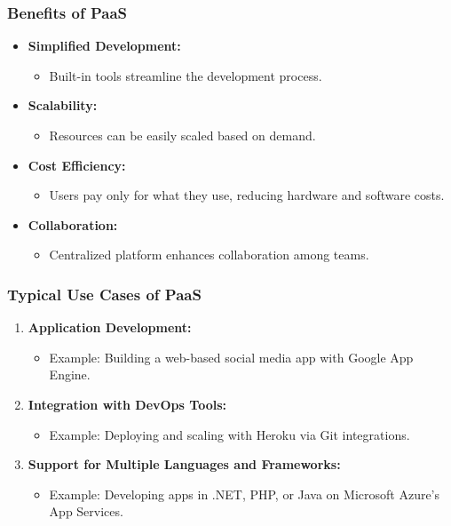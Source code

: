 \documentclass[aspectratio=169]{beamer}
\begin{document}
\begin{frame}[fragile]
    \frametitle{Benefits of PaaS}

    \begin{itemize}
        \item \textbf{Simplified Development:} 
        \begin{itemize}
            \item Built-in tools streamline the development process.
        \end{itemize}
        
        \item \textbf{Scalability:} 
        \begin{itemize}
            \item Resources can be easily scaled based on demand.
        \end{itemize}
        
        \item \textbf{Cost Efficiency:} 
        \begin{itemize}
            \item Users pay only for what they use, reducing hardware and software costs.
        \end{itemize}
        
        \item \textbf{Collaboration:} 
        \begin{itemize}
            \item Centralized platform enhances collaboration among teams.
        \end{itemize}
    \end{itemize}
\end{frame}

\begin{frame}[fragile]
    \frametitle{Typical Use Cases of PaaS}

    \begin{enumerate}
        \item \textbf{Application Development:}
        \begin{itemize}
            \item Example: Building a web-based social media app with Google App Engine.
        \end{itemize}

        \item \textbf{Integration with DevOps Tools:}
        \begin{itemize}
            \item Example: Deploying and scaling with Heroku via Git integrations.
        \end{itemize}

        \item \textbf{Support for Multiple Languages and Frameworks:}
        \begin{itemize}
            \item Example: Developing apps in .NET, PHP, or Java on Microsoft Azure’s App Services.
        \end{itemize}
    \end{enumerate}
\end{frame}
\end{document}
